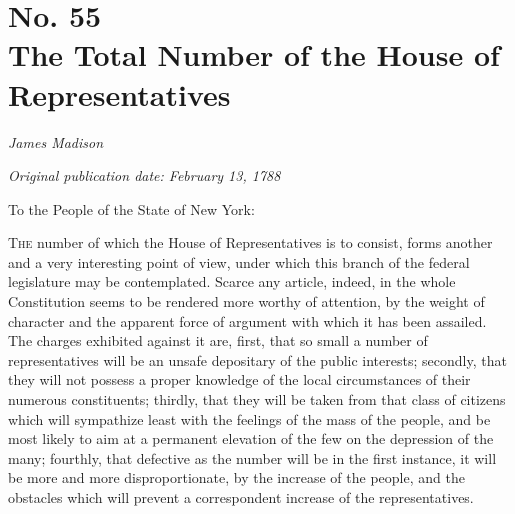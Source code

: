 \chapter[No. 55: The Total Number of the House of Representatives]{No. 55\\ {\small The Total Number of the House of Representatives}}

\textit{James Madison}

\textit{Original publication date: February 13, 1788}
\vspace{1cm}

To the People of the State of New York:
\vspace{.4cm}

\textsc{The} number of which the House of Representatives is to consist, forms another and a very interesting point of view, under which this branch of the federal legislature may be contemplated. 
Scarce any article, indeed, in the whole Constitution seems to be rendered more worthy of attention, by the weight of character and the apparent force of argument with which it has been assailed. 
The charges exhibited against it are, first, that so small a number of representatives will be an unsafe depositary of the public interests; secondly, that they will not possess a proper knowledge of the local circumstances of their numerous constituents; thirdly, that they will be taken from that class of citizens which will sympathize least with the feelings of the mass of the people, and be most likely to aim at a permanent elevation of the few on the depression of the many; fourthly, that defective as the number will be in the first instance, it will be more and more disproportionate, by the increase of the people, and the obstacles which will prevent a correspondent increase of the representatives.

